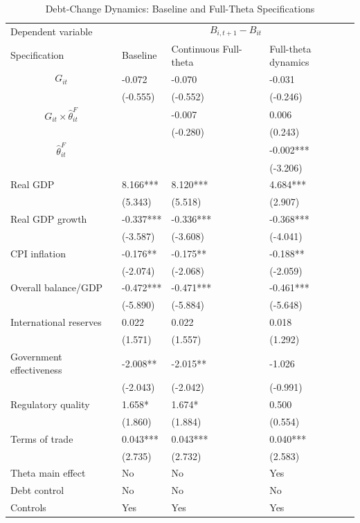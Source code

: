 \begin{table}[H]\centering
\begin{threeparttable}
\caption{Debt-Change Dynamics: Baseline and Full-Theta Specifications}
\label{tab:debt_change_combined_fulltheta}
\scriptsize
\begin{tabularx}{\textwidth}{lYYY}
\toprule
Dependent variable &  \\
\cmidrule(lr){2-4}
Specification & Baseline & Continuous Full-theta & Full-theta dynamics \\
\midrule
$$G_{it}$$ & -0.072 & -0.070 & -0.031 \\
 & (-0.555) & (-0.552) & (-0.246) \\
$$G_{it}\times\widehat{\theta}^{F}_{it}$$ &  & -0.007 & 0.006 \\
 &  & (-0.280) & (0.243) \\
$$\widehat{\theta}^{F}_{it}$$ &  &  & -0.002*** \\
 &  &  & (-3.206) \\
Real GDP & 8.166*** & 8.120*** & 4.684*** \\
 & (5.343) & (5.518) & (2.907) \\
Real GDP growth & -0.337*** & -0.336*** & -0.368*** \\
 & (-3.587) & (-3.608) & (-4.041) \\
CPI inflation & -0.176** & -0.175** & -0.188** \\
 & (-2.074) & (-2.068) & (-2.059) \\
Overall balance/GDP & -0.472*** & -0.471*** & -0.461*** \\
 & (-5.890) & (-5.884) & (-5.648) \\
International reserves & 0.022 & 0.022 & 0.018 \\
 & (1.571) & (1.557) & (1.292) \\
Government effectiveness & -2.008** & -2.015** & -1.026 \\
 & (-2.043) & (-2.042) & (-0.991) \\
Regulatory quality & 1.658* & 1.674* & 0.500 \\
 & (1.860) & (1.884) & (0.554) \\
Terms of trade & 0.043*** & 0.043*** & 0.040*** \\
 & (2.735) & (2.732) & (2.583) \\
\midrule
Theta main effect & No & No & Yes \\
Debt control & No & No & No \\
Controls & Yes & Yes & Yes \\

\end{tabularx}
\end{threeparttable}
\end{table}
